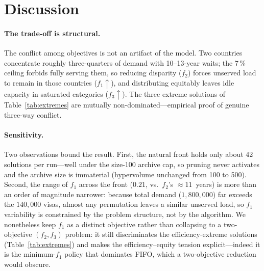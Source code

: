 \documentclass[runningheads]{llncs}
\begin{document}
\section{Discussion}
\label{sec:discussion}

\paragraph{The trade-off is structural.}
The conflict among objectives is not an artifact of the model. Two countries concentrate roughly three-quarters of demand with 10--13-year waits; the 7\,\% ceiling forbids fully serving them, so reducing disparity ($f_2$) forces unserved load to remain in those countries ($f_1\!\uparrow$), and distributing equitably leaves idle capacity in saturated categories ($f_3\!\uparrow$). The three extreme solutions of Table~\ref{tab:extremes} are mutually non-dominated---empirical proof of genuine three-way conflict.

\paragraph{Sensitivity.}
Two observations bound the result. First, the natural front holds only about 42 solutions per run---well under the size-100 archive cap, so pruning never activates and the archive size is immaterial (hypervolume unchanged from 100 to 500). Second, the range of $f_1$ across the front ($0.21$, vs.\ $f_2$'s ${\approx}11$~years) is more than an order of magnitude narrower: because total demand ($1{,}800{,}000$) far exceeds the $140{,}000$ visas, almost any permutation leaves a similar unserved load, so $f_1$ variability is constrained by the problem structure, not by the algorithm. We nonetheless keep $f_1$ as a distinct objective rather than collapsing to a two-objective $(f_2,f_3)$ problem: it still discriminates the efficiency-extreme solutions (Table~\ref{tab:extremes}) and makes the efficiency--equity tension explicit---indeed it is the minimum-$f_1$ policy that dominates FIFO, which a two-objective reduction would obscure.
\end{document}
